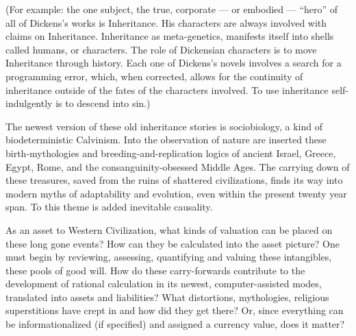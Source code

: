 (For example: the one subject, the true,
corporate --- or embodied --- \enquote{hero} of all of
Dickens's works is Inheritance. His characters are always involved with claims on
Inheritance. Inheritance as meta-genetics,
manifests itself into shells called humans, or
characters. The role of Dickensian characters
is to move Inheritance through history. Each
one of Dickens's novels involves a search for
a programming error, which, when corrected,
allows for the continuity of inheritance outside of the fates of the characters involved.
To use inheritance self-indulgently is to
descend into sin.)

The newest version of these old inheritance stories is sociobiology, a kind of biodeterministic Calvinism. Into the observation of nature are inserted these birth-mythologies and breeding-and-replication logics
of ancient Israel, Greece, Egypt, Rome, and
the consanguinity-obsessed Middle Ages.
The carrying down of these treasures, saved
from the ruins of shattered civilizations,
finds its way into modern myths of adaptability and evolution, even within the present
twenty year span. To this theme is added
inevitable causality.

As an asset to Western Civilization, what
kinds of valuation can be placed on these
long gone events? How can they be calculated into the asset picture? One must begin
by reviewing, assessing, quantifying and
valuing these intangibles, these pools of
good will. How do these carry-forwards contribute to the development of rational calculation in its newest, computer-assisted modes,
translated into assets and liabilities? What
distortions, mythologies, religious superstitions have crept in and how did they get
there? Or, since everything can be informationalized (if specified) and assigned a currency value, does it matter?

